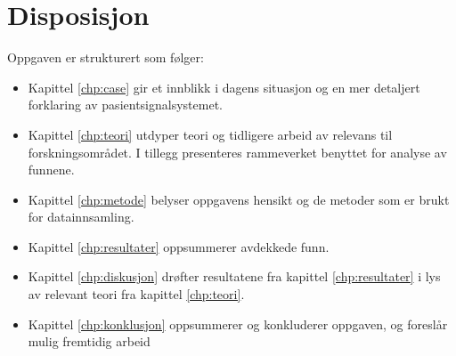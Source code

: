 \section{Disposisjon}
Oppgaven er strukturert som følger:
\begin{itemize}
\item Kapittel \ref{chp:case} gir et innblikk i dagens situasjon og en mer detaljert forklaring av pasientsignalsystemet.
\item Kapittel \ref{chp:teori} utdyper teori og tidligere arbeid av relevans til forskningsområdet. I tillegg presenteres rammeverket benyttet for analyse av funnene.
\item Kapittel \ref{chp:metode} belyser oppgavens hensikt og de metoder som er brukt for datainnsamling.
\item Kapittel \ref{chp:resultater} oppsummerer avdekkede funn.
\item Kapittel \ref{chp:diskusjon} drøfter resultatene fra kapittel \ref{chp:resultater} i lys av relevant teori fra kapittel \ref{chp:teori}.
\item Kapittel \ref{chp:konklusjon} oppsummerer og konkluderer oppgaven, og foreslår mulig fremtidig arbeid
\end{itemize}


